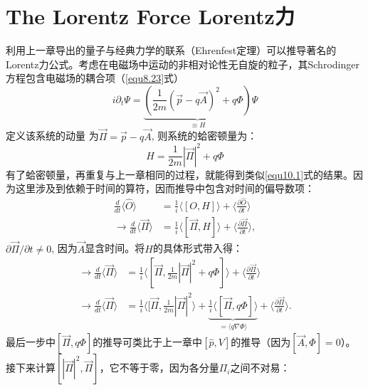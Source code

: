 \section[Lorentz力]{The Lorentz Force \quad Lorentz力}
\label{sec11.2}
利用上一章导出的量子与经典力学的联系（Ehrenfest定理）可以推导著名的Lorentz力公式。考虑在电磁场中运动的非相对论性无自旋的粒子，其Schrodinger方程包含电磁场的耦合项（\ref{equ8.23}式）%
\begin{equation}
\label{equ11.18}
    i \partial_t \Psi = \underbrace{ \left( \frac{1}{2m} (\vec{p} - q\vec{A})^2 + q \Phi \right)}_{\equiv H} \Psi
\end{equation}
定义该系统的动量%
%
为$\vec{\Pi} = \vec{p} - q \vec{A}$, 则系统的蛤密顿量为：
\begin{equation*}
    H = \frac{1}{2m} |\vec{\Pi}|^2 + q \Phi
\end{equation*}
有了蛤密顿量，再重复与上一章相同的过程，就能得到类似\ref{equ10.1}式的结果。因为这里涉及到依赖于时间的算符，因而推导中包含对时间的偏导数项：
\begin{align*}
    \frac{d}{dt} \langle \hat{O} \rangle &= \frac{1}{i} \langle [O, H] \rangle + \langle \frac{\partial \hat{O}}{\partial t} \rangle \\
    \to \frac{d}{dt} \langle \vec{\Pi} \rangle &= \frac{1}{i} \langle [\vec{\Pi}, H] \rangle + \langle \frac{\partial \vec{\Pi}}{\partial t} \rangle,
\end{align*}
$\partial \vec{\Pi} / \partial t \neq 0$, 因为$\vec{A}$显含时间。将$H$的具体形式带入得：
\begin{align*}
    \to \frac{d}{dt} \langle \vec{\Pi} \rangle &= \frac{1}{i} \langle [\vec{\Pi}, \frac{1}{2m} |\vec{\Pi}|^2 + q \Phi] \rangle + \langle \frac{\partial \vec{\Pi}}{\partial t} \rangle \\
    \to \frac{d}{dt} \langle \vec{\Pi} \rangle &= \frac{1}{i} \langle [\vec{\Pi}, \frac{1}{2m} |\vec{\Pi}|^2 \rangle + \underbrace{ \frac{1}{i} \langle [\vec{\Pi}, q\Phi] \rangle }_{ = \langle q \nabla \Phi \rangle } + \langle \frac{\partial \vec{\Pi}}{\partial t} \rangle .
\end{align*}
最后一步中$[\vec{\Pi}, q\Phi]$的推导可类比于上一章中$[\hat{p}, V]$的推导（因为$[\vec{A}, \Phi] = 0$）。接下来计算$[|\vec{\Pi}|^2, \vec{\Pi}]$，它不等于零，因为各分量$\Pi_i$之间不对易：
